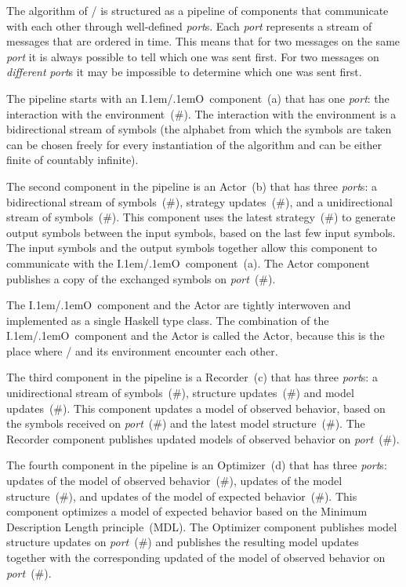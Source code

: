 \documentclass[12pt,a4paper]{artikel3}
\def\Name#1{{\sffamily #1}}
\def\NR#1{(\#\relax #1)}
\def\Port/{\emph{port\/}}
\def\PortNR#1{\Port/~\NR{#1}}
\def\IO/{\Name{I\kern .1em/\kern .1emO}}
\def\Actor/{\Name{Actor}}
\def\Encounter/{\Name{Actor}}
\def\Recorder/{\Name{Recorder}}
\def\Optimizer/{\Name{Optimizer}}
\begin{document}
The algorithm of \LExAu/ is structured as a pipeline of components that communicate with each other through well-defined \Port/s. Each \Port/ represents a stream of messages that are ordered in time. This means that for two messages on the same \Port/ it is always possible to tell which one was sent first. For two messages on \emph{different} \Port/s it may be impossible to determine which one was sent first.

The pipeline starts with an \IO/~component~(a) that has one \Port/: the interaction with the environment~\NR{1}. The interaction with the environment is a bidirectional stream of symbols (the alphabet from which the symbols are taken can be chosen freely for every instantiation of the algorithm and can be either finite of countably infinite).

The second component in the pipeline is an \Actor/~(b) that has three \Port/s: a bidirectional stream of symbols~\NR{1}, strategy updates~\NR{5}, and a unidirectional stream of symbols~\NR{2}. This component uses the latest strategy~\NR{5} to generate output symbols between the input symbols, based on the last few input symbols. The input symbols and the output symbols together allow this component to communicate with the \IO/~component~(a). The \Actor/ component publishes a copy of the exchanged symbols on \PortNR{2}.

The \IO/~component and the \Actor/ are tightly interwoven and implemented as a single Haskell type class. The combination of the \IO/~component and the \Actor/ is called the \Encounter/, because this is the place where \LExAu/ and its environment encounter each other.

The third component in the pipeline is a \Recorder/~(c) that has three \Port/s: a unidirectional stream of symbols~\NR{2}, structure updates~\NR{6} and model updates~\NR{3}. This component updates a model of observed behavior, based on the symbols received on \PortNR{2} and the latest model structure~\NR{6}. The \Recorder/ component publishes updated models of observed behavior on \PortNR{3}.

The fourth component in the pipeline is an \Optimizer/~(d) that has three \Port/s: updates of the model of observed behavior~\NR{3}, updates of the model structure~\NR{6}, and updates of the model of expected behavior~\NR{4}. This component optimizes a model of expected behavior based on the Minimum Description Length principle~(MDL). The \Optimizer/ component publishes model structure updates on \PortNR{6} and publishes the resulting model updates together with the corresponding updated of the model of observed behavior on \PortNR{4}.
\end{document}
